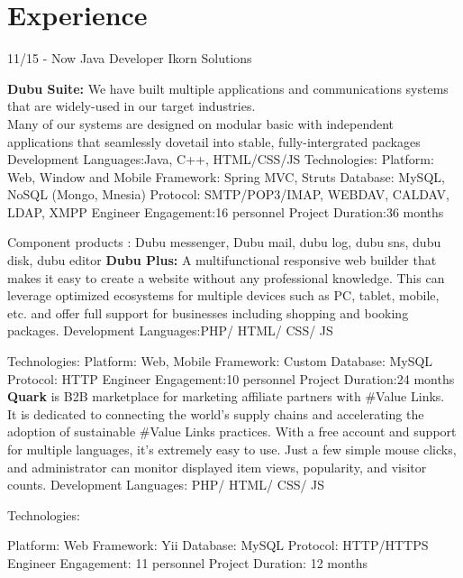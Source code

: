 \documentclass[]{friggeri-cv}
\begin{document}
\section{Experience}
\begin{entrylist}
  \entry
    {11/15 - Now}
    {Java Developer}
    {Ikorn Solutions}
    {\textbf{Dubu Suite: }We have built multiple applications and communications systems that are widely-used in our target industries.\\
 Many of our systems are designed on modular basic with independent applications that seamlessly dovetail into stable, fully-intergrated packages\\ 
Development Languages:Java, C++, HTML/CSS/JS
Technologies:
Platform: Web, Window and Mobile
Framework: Spring MVC, Struts
Database: MySQL, NoSQL (Mongo, Mnesia)
Protocol: SMTP/POP3/IMAP, WEBDAV, CALDAV, LDAP, XMPP
Engineer Engagement:16 personnel
Project Duration:36 months

	
	Component products :
	Dubu messenger, Dubu mail, dubu log, dubu sns, dubu disk, dubu editor
     \textbf{Dubu Plus: } %
A multifunctional responsive web builder that makes it easy to create a website without any professional knowledge. This can leverage optimized ecosystems for multiple devices such as PC, tablet, mobile, etc. and offer full support for businesses including shopping and booking packages.
Development Languages:PHP/ HTML/ CSS/ JS

Technologies:
Platform: Web, Mobile
Framework: Custom
Database: MySQL
Protocol: HTTP
Engineer Engagement:10 personnel
Project Duration:24 months
   \\ \textbf{Quark}  is B2B marketplace for marketing affiliate partners with \#Value Links.\\ It is dedicated to connecting the world’s supply chains and accelerating the adoption of sustainable \#Value Links practices.
With a free account and support for multiple languages, it’s extremely easy to use. Just a few simple mouse clicks, and administrator can monitor displayed item views, popularity, and visitor counts.
Development Languages: PHP/ HTML/ CSS/ JS

Technologies:

Platform: Web
Framework: Yii
Database: MySQL
Protocol: HTTP/HTTPS
Engineer Engagement: 11 personnel
Project Duration: 12 months

}
\end{entrylist}
\end{document}
